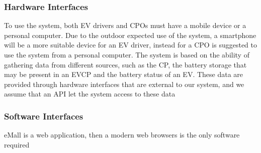 \begin{figure}[H]
    \centering
\end{figure}
\pagebreak



\subsubsection{Hardware Interfaces}
To use the system, both EV drivers and CPOs must have a mobile device or a personal computer.
Due to the outdoor expected use of the system, a smartphone will be a more suitable device
for an EV driver, instead for a CPO is suggested to use the system from a personal computer.
The system is based on the ability of gathering data from different sources, such as the CP, the battery storage that may be present in an EVCP and the battery status of an EV. These data are provided through hardware interfaces that are external
to our system, and we assume that an API let the system access to these data

\subsubsection{Software Interfaces}
eMall is a web application, then a modern web browsers is the only software required

